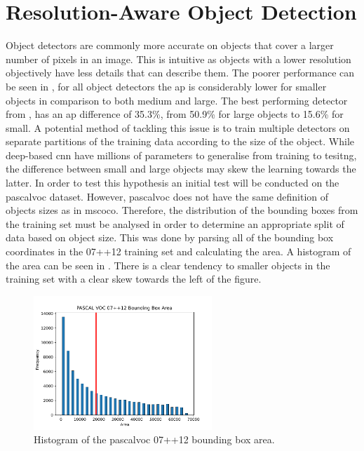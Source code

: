 \section{Resolution-Aware Object Detection}\label{sec:resawareSec}
Object detectors are commonly more accurate on objects that cover a larger number of pixels in an image. This is intuitive as objects with a lower resolution objectively have less details that can describe them. The poorer performance can be seen in , for all object detectors the \gls{ap} is considerably lower for smaller objects in comparison to both medium and large. The best performing detector from \cite{deepres}, has an \gls{ap} difference of 35.3\%, from 50.9\% for large objects to 15.6\% for small. 
A potential method of tackling this issue is to train multiple detectors on separate partitions of the training data according to the size of the object. While deep-based \gls{cnn} have millions of parameters to generalise from training to tesitng, the difference between small and large objects may skew the learning towards the latter. In order to test this hypothesis an initial test will be conducted on the \gls{pascalvoc} dataset. However, \gls{pascalvoc} does not have the same definition of objects sizes as in \gls{mscoco}. Therefore, the distribution of the bounding boxes from the training set must be analysed in order to determine an appropriate split of data based on object size. This was done by parsing all of the bounding box coordinates in the 07++12 training set and calculating the area. A histogram of the area can be seen in . There is a clear tendency to smaller objects in the training set with a clear skew towards the left of the figure.

\begin{figure}[H]
  \centering
    \includegraphics[width=0.6\textwidth]{Figs/Implementation/0712histred.pdf}
      \caption{Histogram of the \gls{pascalvoc} 07++12 bounding box area.}
    \label{fig:0712hist}
\end{figure}

